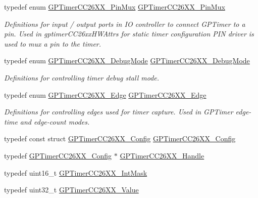 \begin{DoxyCompactItemize}
typedef enum \hyperlink{_g_p_timer_c_c26_x_x_8h_ab4a2e82c659e0ea1fa2ae7a852298359}{G\+P\+Timer\+C\+C26\+X\+X\+\_\+\+Pin\+Mux} \hyperlink{_g_p_timer_c_c26_x_x_8h_a02bcd903a770b3bc9bea666cf5b0bded}{G\+P\+Timer\+C\+C26\+X\+X\+\_\+\+Pin\+Mux}
\begin{DoxyCompactList}\small\item\em Definitions for input / output ports in I\+O controller to connect G\+P\+Timer to a pin. Used in gptimer\+C\+C26xx\+H\+W\+Attrs for static timer configuration P\+I\+N driver is used to mux a pin to the timer. \end{DoxyCompactList}\item 
typedef enum \hyperlink{_g_p_timer_c_c26_x_x_8h_ab4c80c79c9acaf8e482e8244adbae73e}{G\+P\+Timer\+C\+C26\+X\+X\+\_\+\+Debug\+Mode} \hyperlink{_g_p_timer_c_c26_x_x_8h_a1c5a4b610efe0481e6ebf9575820a6f3}{G\+P\+Timer\+C\+C26\+X\+X\+\_\+\+Debug\+Mode}
\begin{DoxyCompactList}\small\item\em Definitions for controlling timer debug stall mode. \end{DoxyCompactList}\item 
typedef enum \hyperlink{_g_p_timer_c_c26_x_x_8h_ac72f25419727329702ec162a2b6b9151}{G\+P\+Timer\+C\+C26\+X\+X\+\_\+\+Edge} \hyperlink{_g_p_timer_c_c26_x_x_8h_a32b251408c3c97a16d017a095555aa18}{G\+P\+Timer\+C\+C26\+X\+X\+\_\+\+Edge}
\begin{DoxyCompactList}\small\item\em Definitions for controlling edges used for timer capture. Used in G\+P\+Timer edge-\/time and edge-\/count modes. \end{DoxyCompactList}\item 
typedef const struct \hyperlink{struct_g_p_timer_c_c26_x_x___config}{G\+P\+Timer\+C\+C26\+X\+X\+\_\+\+Config} \hyperlink{_g_p_timer_c_c26_x_x_8h_aa5a5955bada127ddac4d46b55f86b848}{G\+P\+Timer\+C\+C26\+X\+X\+\_\+\+Config}
\item 
typedef \hyperlink{struct_g_p_timer_c_c26_x_x___config}{G\+P\+Timer\+C\+C26\+X\+X\+\_\+\+Config} $\ast$ \hyperlink{_g_p_timer_c_c26_x_x_8h_ab85403dde5940c587c57ca1a140e655a}{G\+P\+Timer\+C\+C26\+X\+X\+\_\+\+Handle}
\item 
typedef uint16\+\_\+t \hyperlink{_g_p_timer_c_c26_x_x_8h_ac74410bfd92bf89732dd795bbe8769d1}{G\+P\+Timer\+C\+C26\+X\+X\+\_\+\+Int\+Mask}
\item 
typedef uint32\+\_\+t \hyperlink{_g_p_timer_c_c26_x_x_8h_ab667a2fd47273a9778f5011774fa55c0}{G\+P\+Timer\+C\+C26\+X\+X\+\_\+\+Value}

\end{DoxyCompactItemize}
